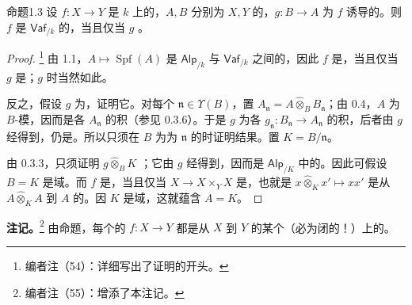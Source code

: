 \begin{SGAresult}{命题}{1.3}
设 $f:X\to Y$ 是 $k$ 上的，$A,B$ 分别为 $X,Y$ 的，$g:B\to A$ 为 $f$ 诱导的。则 $f$ 是 $\mathsf{Vaf}_{/k}$ 的，当且仅当 $g$ 。
\end{SGAresult}
\begin{proof}
\footnote{编者注（54）：详细写出了证明的开头。} 由 1.1，$A\mapsto\operatorname{Spf}(A)$ 是 $\mathsf{Alp}_{/k}$ 与 $\mathsf{Vaf}_{/k}$ 之间的，因此 $f$ 是，当且仅当 $g$ 是；$g$ 时当然如此。

反之，假设 $g$ 为，证明它。对每个 $\mathfrak n\in\Upsilon(B)$，置 $A_{\mathfrak n}=A\widehat\otimes_B B_{\mathfrak n}$；由 0.4，$A$ 为 $B$-模，因而是各 $A_{\mathfrak n}$ 的积（参见 0.3.6）。于是 $g$ 为各 $g_{\mathfrak n}:B_{\mathfrak n}\to A_{\mathfrak n}$ 的积，后者由 $g$ 经得到，仍是。所以只须在 $B$ 为为 $\mathfrak n$ 的时证明结果。置 $K=B/\mathfrak n$。

由  0.3.3，只须证明 $g\widehat\otimes_B K$ ；它由 $g$ 经得到，因而是 $\mathsf{Alp}_{/K}$ 中的。因此可假设 $B=K$ 是域。而 $f$ 是，当且仅当 $X\to X\times_Y X$ 是，也就是 $x\widehat\otimes_K x'\mapsto xx'$ 是从 $A\widehat\otimes_K A$ 到 $A$ 的。因 $K$ 是域，这就蕴含 $A=K$。
\end{proof}
\textbf{注记。}\footnote{编者注（55）：增添了本注记。} 由命题，每个的 $f:X\to Y$ 都是从 $X$ 到 $Y$ 的某个（必为闭的！）上的。


